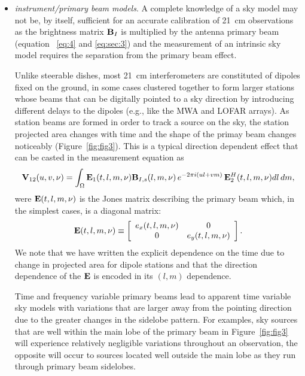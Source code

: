 \begin{itemize}
\item {\it instrument/primary beam models}. A complete knowledge of a sky model may not be, by itself, sufficient for an accurate calibration of 21~cm observations as the brightness matrix ${\bf B}_I$ is multiplied by the antenna primary beam (equation~ \ref{eq:4} and \ref{eq:sec:3}) and the measurement of an intrinsic sky model requires the separation from the primary beam effect. 

Unlike steerable dishes, most 21~cm interferometers are constituted of dipoles fixed on the ground, in some cases clustered together to form larger stations whose beams that can be digitally pointed to a sky direction by introducing different delays to the dipoles (e.g., like the MWA and LOFAR arrays). As station beams are formed in order to track a source on the sky, the station projected area changes with time and the shape of the primay beam changes noticeably (Figure~\ref{fig:fig3}). This is a typical direction dependent effect that can be casted in the measurement equation as
\begin{equation}
{\bf V}_{12} (u,v,\nu) = \int_\Omega {\bf E}_1 (t, l, m, \nu) {\bf B}_{I,s} (l, m, \nu) \, e^{-2 \pi i (ul + vm)} \, {\bf E}_2^H (t, l, m, \nu)  dl \, dm,
\label{eq:sec:7_added_2}
\end{equation}
were ${\bf E} (t, l, m, \nu)$ is the Jones matrix describing the primary beam which, in the simplest cases, is a diagonal matrix:
\begin{equation}
    {\bf E} (t, l, m, \nu) \equiv 
    \left[
    \begin{array}{cc}
    e_x (t, l, m, \nu) 	& 	0 	\\
    0 		& e_y (t, l, m, \nu) 	\\
    \end{array}
    \right].
\label{eq:sec:4}
\end{equation} 
We note that we have written the explicit dependence on the time due to change in projected area for dipole stations and that the direction dependence of the ${\bf E}$ is encoded in its $(l, m)$ dependence.

Time and frequency variable primary beams lead to apparent time variable sky models with variations that are larger away from the pointing direction due to the greater changes in the sidelobe pattern. For examples, sky sources that are well within the main lobe of the primary beam in Figure~\ref{fig:fig3} will experience relatively negligible variations throughout an observation, the opposite will occur to sources located well outside the main lobe as they run through primary beam sidelobes.


\end{itemize}
